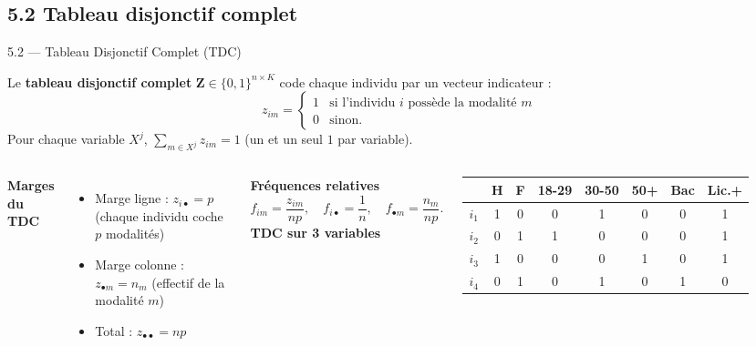 \subsection{5.2 Tableau disjonctif complet}
\begin{frame}{5.2 — Tableau Disjonctif Complet (TDC)}
\begin{definition}[TDC]
Le \textbf{tableau disjonctif complet} $\mathbf{Z} \in \{0,1\}^{n \times K}$
code chaque individu par un vecteur indicateur :
\[
z_{im} = \begin{cases} 1 & \text{si l'individu } i \text{ possède la modalité } m \\
0 & \text{sinon.} \end{cases}
\]
Pour chaque variable $X^j$, $\sum_{m \in X^j} z_{im} = 1$ (un et un seul $1$ par variable).
\end{definition}

\begin{columns}[T]
\textbf{Marges du TDC}
\begin{itemize}\small
  \item Marge ligne : $z_{i\bullet} = p$ (chaque individu coche $p$ modalités)
  \item Marge colonne : $z_{\bullet m} = n_m$ (effectif de la modalité $m$)
  \item Total : $z_{\bullet \bullet} = n p$
\end{itemize}

\vspace{0.2cm}
\textbf{Fréquences relatives}
\[
f_{im} = \frac{z_{im}}{np}, \quad
f_{i\bullet} = \frac{1}{n}, \quad
f_{\bullet m} = \frac{n_m}{np}.
\]
\centering
\footnotesize
\renewcommand{\arraystretch}{1.05}
\textbf{TDC sur 3 variables}\\[0.1cm]
\begin{tabular}{c|cc|ccc|cc}
& H & F & 18-29 & 30-50 & 50+ & Bac & Lic.+ \\
\hline
$i_1$ & 1 & 0 & 0 & 1 & 0 & 0 & 1 \\
$i_2$ & 0 & 1 & 1 & 0 & 0 & 0 & 1 \\
$i_3$ & 1 & 0 & 0 & 0 & 1 & 0 & 1 \\
$i_4$ & 0 & 1 & 0 & 1 & 0 & 1 & 0 \\
\end{tabular}
\end{columns}
\end{frame}

